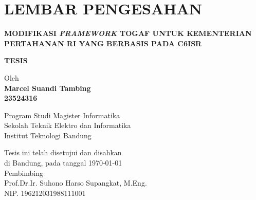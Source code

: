 \chapter*{LEMBAR PENGESAHAN}


\begin{center}
    \vspace{2cm}
  {\large\bfseries MODIFIKASI \textit{FRAMEWORK} TOGAF UNTUK KEMENTERIAN PERTAHANAN RI YANG BERBASIS PADA C6ISR}\\
     \vspace{2cm}

  {\Large \textbf{TESIS}}\\


  \vspace{1.5cm}
    
    
  {\large Oleh}\\[0.3cm]
    \textbf{
    {\large Marcel Suandi Tambing}\\
    {\large 23524316}
  }\\
    
  \vspace{0.5cm}
 
  {\large Program Studi Magister Informatika}\\
  {\large Sekolah Teknik Elektro dan Informatika}\\
  {\large Institut Teknologi Bandung}\\

  \vspace{1.5cm}

  Tesis ini telah disetujui dan disahkan\\ 
  di Bandung, pada tanggal \today\\[1cm]

	Pembimbing  \\[3cm]
	Prof.Dr.Ir. Suhono Harso Supangkat, M.Eng.   \\[0.2cm]
	NIP. 196212031988111001 

\end{center}

\vspace{1cm}
\noindent



